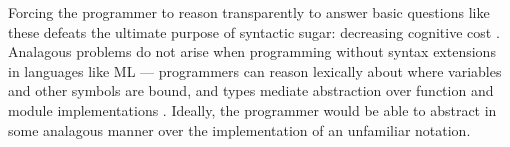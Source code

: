 \documentclass[acmsmall,review,anonymous]{acmart}\settopmatter{printfolios=true,printccs=false,printacmref=false}
\begin{document}
Forcing the programmer to reason transparently to answer basic questions like these defeats the ultimate purpose of syntactic sugar: decreasing cognitive cost \cite{Green89}. Analagous problems do not arise when programming without syntax extensions in languages like ML --- programmers can reason lexically about where variables and other symbols are bound, and types mediate abstraction over function and module implementations \cite{B304}. Ideally, the programmer would be able to abstract in some analagous manner over the implementation of an unfamiliar notation. %
\end{document}
